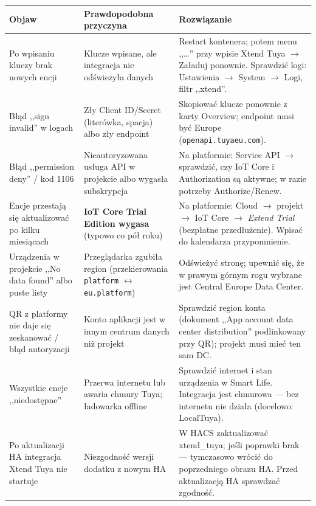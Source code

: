 \documentclass[11pt,a4paper]{article}
\begin{document}
\begin{longtable}{>{\raggedright\arraybackslash}p{4.2cm} >{\raggedright\arraybackslash}p{4.6cm} >{\raggedright\arraybackslash}p{5.6cm}}
\toprule
\textbf{Objaw} & \textbf{Prawdopodobna przyczyna} & \textbf{Rozwiązanie}\\
\midrule
\endhead
Po wpisaniu kluczy brak nowych encji & Klucze wpisane, ale integracja nie odświeżyła danych & Restart kontenera; potem menu ,,\ldots'' przy wpisie Xtend Tuya $\to$ Załaduj ponownie. Sprawdzić logi: Ustawienia $\to$ System $\to$ Logi, filtr ,,xtend''.\\
\addlinespace
Błąd ,,sign invalid'' w logach & Zły Client ID/Secret (literówka, spacja) albo zły endpoint & Skopiować klucze ponownie z karty Overview; endpoint musi być Europe (\texttt{openapi.tuyaeu.com}).\\
\addlinespace
Błąd ,,permission deny'' / kod 1106 & Nieautoryzowana usługa API w projekcie albo wygasła subskrypcja & Na platformie: Service API $\to$ sprawdzić, czy IoT Core i Authorization są aktywne; w razie potrzeby Authorize/Renew.\\
\addlinespace
Encje przestają się aktualizować po kilku miesiącach & \textbf{IoT Core Trial Edition wygasa} (typowo co pół roku) & Na platformie: Cloud $\to$ projekt $\to$ IoT Core $\to$ \emph{Extend Trial} (bezpłatne przedłużenie). Wpisać do kalendarza przypomnienie.\\
\addlinespace
Urządzenia w projekcie ,,No data found'' albo puste listy & Przeglądarka zgubiła region (przekierowania \texttt{platform} $\leftrightarrow$ \texttt{eu.platform}) & Odświeżyć stronę; upewnić się, że w prawym górnym rogu wybrane jest Central Europe Data Center.\\
\addlinespace
QR z platformy nie daje się zeskanować / błąd autoryzacji & Konto aplikacji jest w innym centrum danych niż projekt & Sprawdzić region konta (dokument ,,App account data center distribution'' podlinkowany przy QR); projekt musi mieć ten sam DC.\\
\addlinespace
Wszystkie encje ,,niedostępne'' & Przerwa internetu lub awaria chmury Tuya; ładowarka offline & Sprawdzić internet i stan urządzenia w Smart Life. Integracja jest chmurowa --- bez internetu nie działa (docelowo: LocalTuya).\\
\addlinespace
Po aktualizacji HA integracja Xtend Tuya nie startuje & Niezgodność wersji dodatku z nowym HA & W HACS zaktualizować xtend\_tuya; jeśli poprawki brak --- tymczasowo wrócić do poprzedniego obrazu HA. Przed aktualizacją HA sprawdzać zgodność.\\

\end{longtable}
\end{document}
